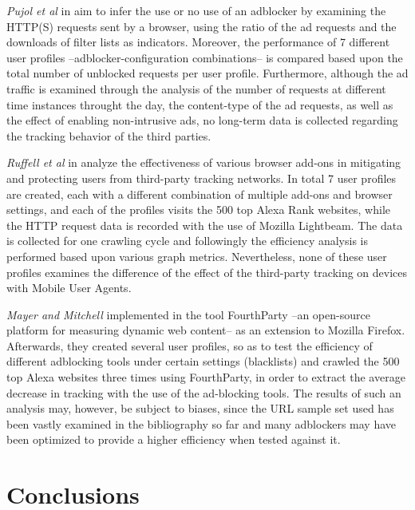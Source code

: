\documentclass{sig-alternate}
\begin{document}
\textit{Pujol et al} in \cite{pujol} aim to infer the use or no use of an adblocker by examining the HTTP(S) requests sent by a browser, using the ratio of the ad requests and the downloads of filter lists as indicators. Moreover, the performance of 7 different user profiles --adblocker-configuration combinations-- is compared based upon the total number of unblocked requests per user profile. Furthermore, although the ad traffic is examined through the analysis of the number of requests at different time instances throught the day, the content-type of the ad requests, as well as the effect of enabling non-intrusive ads, no long-term data is collected regarding the tracking behavior of the third parties.

\textit{Ruffell et al} in \cite{ruffel2015} analyze the effectiveness of various browser add-ons in mitigating and protecting users from third-party tracking networks. In total 7 user profiles are created, each with a different combination of multiple add-ons and browser settings, and each of the profiles visits the 500 top Alexa Rank websites, while the HTTP request data is recorded with the use of Mozilla Lightbeam. The data is collected for one crawling cycle and followingly the efficiency analysis is performed based upon various graph metrics. Nevertheless, none of these user profiles examines the difference of the effect of the third-party tracking on devices with Mobile User Agents.

\textit{Mayer and Mitchell} implemented in \cite{mayer} the tool FourthParty --an open-source platform for measuring dynamic web content-- as an extension to Mozilla Firefox. Afterwards, they created several user profiles, so as to test the efficiency of different adblocking tools under certain settings (blacklists) and crawled the 500 top Alexa websites three times using FourthParty, in order to extract the average decrease in tracking with the use of the ad-blocking tools. The results of such an analysis may, however, be subject to biases, since the URL sample set used has been vastly examined in the bibliography so far and many adblockers may have been optimized to provide a higher efficiency when tested against it.


\section{Conclusions} \label{sec:conclusions}



\end{document}
